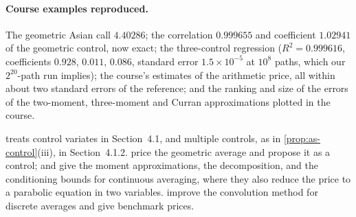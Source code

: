 \paragraph{Course examples reproduced.} The geometric Asian call $4.40286$; the correlation
$0.999655$ and coefficient $1.02941$ of the geometric control, now exact; the three-control
regression ($R^2=0.999616$, coefficients $0.928$, $0.011$, $0.086$, standard error
$1.5\times10^{-5}$ at $10^8$ paths, which our $2^{20}$-path run implies); the course's
estimates of the arithmetic price, all within about two standard errors of the reference; and
the ranking and size of the errors of the two-moment, three-moment and Curran approximations
plotted in the course.

\furtherreading
\textcite{glasserman-mc} treats control variates in Section~4.1, and multiple controls, as in
\cref{prop:as-control}(iii), in Section~4.1.2. \textcite{kemna-vorst} price the
geometric average and propose it as a control; \textcite{turnbull-wakeman} and
\textcite{levy-1992} give the moment approximations, \textcite{curran} the decomposition,
and \textcite{rogers-shi} the conditioning bounds for continuous averaging, where they also
reduce the price to a parabolic equation in two variables. \textcite{cerny-kyriakou} improve the
convolution method for discrete averages and give benchmark prices.
